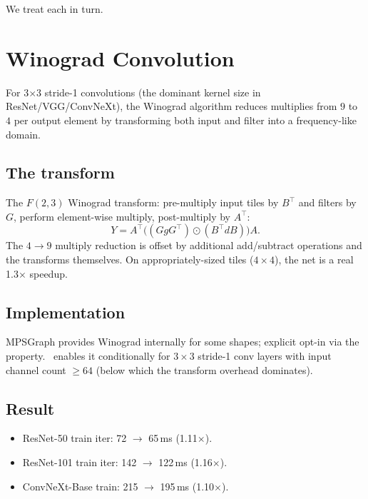 We treat each in turn.

\section{Winograd Convolution}
\label{sec:no_compile_sweep:winograd}

For 3$\times$3 stride-1 convolutions (the dominant kernel size
in ResNet/VGG/ConvNeXt), the Winograd algorithm
\cite{dumoulin_guide_2016} reduces multiplies from $9$ to $4$
per output element by transforming both input and filter into
a frequency-like domain.

\subsection{The transform}
\label{ssec:no_compile_sweep:winograd_transform}

The $F(2, 3)$ Winograd transform: pre-multiply input tiles by
$B^\top$ and filters by $G$, perform element-wise multiply,
post-multiply by $A^\top$:
\[
  Y = A^\top \bigl( (G g G^\top) \odot (B^\top d B) \bigr) A.
\]
The $4 \to 9$ multiply reduction is offset by additional
add/subtract operations and the transforms themselves. On
appropriately-sized tiles ($4 \times 4$), the net is a real
1.3$\times$ speedup.

\subsection{Implementation}
\label{ssec:no_compile_sweep:winograd_impl}

MPSGraph provides Winograd internally for some shapes; explicit
opt-in via the  property. \Lucid\
enables it conditionally for $3 \times 3$ stride-1 conv layers
with input channel count $\geq 64$ (below which the transform
overhead dominates).

\subsection{Result}
\label{ssec:no_compile_sweep:winograd_result}

\begin{itemize}
  \item ResNet-50 train iter: 72 $\to$ 65\,ms (1.11$\times$).
  \item ResNet-101 train iter: 142 $\to$ 122\,ms (1.16$\times$).
  \item ConvNeXt-Base train: 215 $\to$ 195\,ms (1.10$\times$).
\end{itemize}

